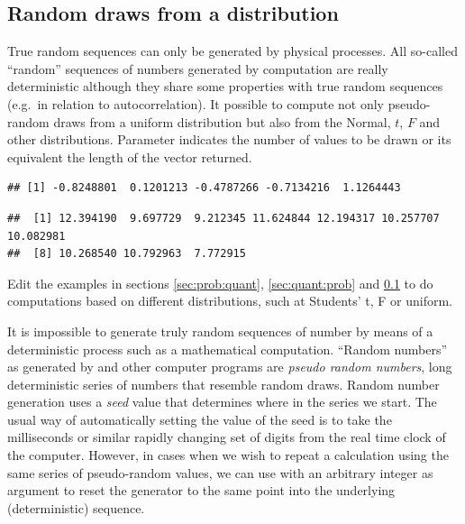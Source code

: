 \documentclass[krantz2]{krantz}\usepackage{knitr}%
\begin{document}
\subsection{Random draws from a distribution}\label{sec:stat:random}

True random sequences can only be generated by physical processes. All so-called ``random'' sequences of numbers generated by computation are really deterministic although they share some properties with true random sequences (e.g.\ in relation to autocorrelation). It possible to compute not only pseudo-random draws from a uniform distribution but also from the Normal, $t$, $F$ and other distributions. Parameter  indicates the number of values to be drawn or its equivalent the length of the vector returned.

\begin{knitrout}\footnotesize
{}\color{fgcolor}\begin{kframe}
\begin{alltt}
\hlstd{(}\hlstd{)}
\end{alltt}
\begin{verbatim}
## [1] -0.8248801  0.1201213 -0.4787266 -0.7134216  1.1264443
\end{verbatim}
\begin{alltt}
\hlstd{(} \hlstd{=} \hlstd{,}  \hlstd{=} \hlstd{,}  \hlstd{=} \hlstd{)}
\end{alltt}
\begin{verbatim}
##  [1] 12.394190  9.697729  9.212345 11.624844 12.194317 10.257707 10.082981
##  [8] 10.268540 10.792963  7.772915
\end{verbatim}
\end{kframe}
\end{knitrout}

\begin{playground}
Edit the examples in sections \ref{sec:prob:quant}, \ref{sec:quant:prob} and \ref{sec:stat:random} to do computations based on different distributions, such at Students' t, F or uniform.
\end{playground}

\begin{explainbox}
It is impossible to generate truly random sequences of number by means of a deterministic process such as a mathematical computation. ``Random numbers'' as generated by \Rpgrm and other computer programs are \emph{pseudo random numbers}, long deterministic series of numbers that resemble random draws. Random number generation uses a \emph{seed} value that determines where in the series we start. The usual way of automatically setting the value of the seed is to take the milliseconds or similar rapidly changing set of digits from the real time clock of the computer. However, in cases when we wish to repeat a calculation using the same series of pseudo-random values, we can use  with an arbitrary integer as argument to reset the generator to the same point into the underlying (deterministic) sequence.
\end{explainbox}
\end{document}

